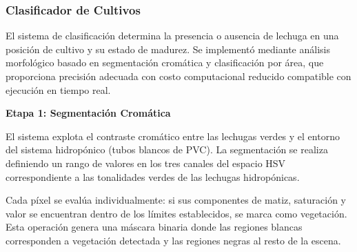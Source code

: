 \subsubsection{Clasificador de Cultivos}

El sistema de clasificación determina la presencia o ausencia de lechuga en una posición de cultivo y su estado de madurez. Se implementó mediante análisis morfológico basado en segmentación cromática y clasificación por área, que proporciona precisión adecuada con costo computacional reducido compatible con ejecución en tiempo real.

\textbf{Etapa 1: Segmentación Cromática}

El sistema explota el contraste cromático entre las lechugas verdes y el entorno del sistema hidropónico (tubos blancos de PVC). La segmentación se realiza definiendo un rango de valores en los tres canales del espacio HSV correspondiente a las tonalidades verdes de las lechugas hidropónicas.

Cada píxel se evalúa individualmente: si sus componentes de matiz, saturación y valor se encuentran dentro de los límites establecidos, se marca como vegetación. Esta operación genera una máscara binaria donde las regiones blancas corresponden a vegetación detectada y las regiones negras al resto de la escena.

